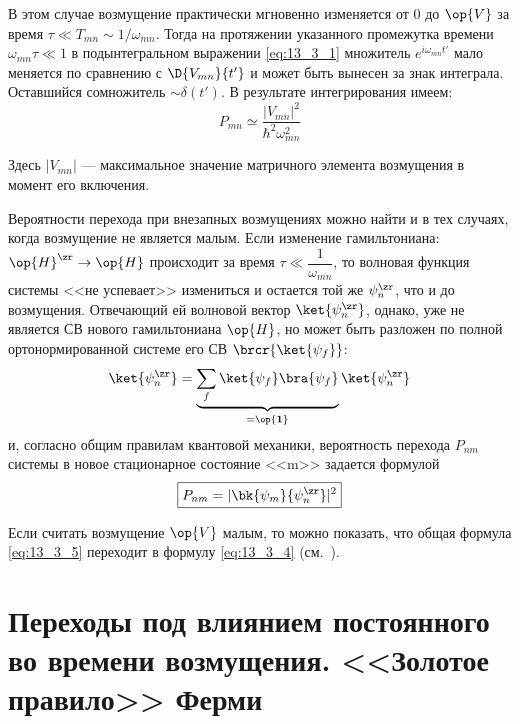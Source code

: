 В этом случае возмущение практически мгновенно изменяется от 0 до $\op{V}$ за время $\tau \ll T_{mn} \sim 1/\omega_{mn}$. Тогда на протяжении указанного промежутка времени $\omega_{mn} \tau \ll 1$ в подынтегральном выражении \eqref{eq:13_3_1} множитель $e^{i\omega_{mn} t'}$ мало меняется по сравнению с $\D{V_{mn}}{t'}$ и может быть вынесен за знак интеграла. Оставшийся сомножитель $\sim \delta(t')$. В результате интегрирования имеем:
\begin{equation}
\label{eq:13_3_4}
\boxed{P_{mn} \simeq \frac{|V_{mn}|^2}{\hbar^2 \omega_{mn}^2}}
\end{equation}

Здесь $|V_{mn}|$ --- максимальное значение матричного элемента возмущения в момент его включения.

Вероятности перехода при внезапных возмущениях можно найти и в тех случаях, когда возмущение не является малым. Если изменение гамильтониана: $\op{H}^\zr \to \op{H}$ происходит за время $\tau \ll \dfrac{1}{\omega_{mn}}$, то волновая функция системы <<не успевает>> измениться и остается той же $\psi_n^\zr$, что и до возмущения. Отвечающий ей волновой вектор $\ket{\psi_n^\zr}$, однако, уже не является СВ нового гамильтониана $\op{H}$, но может быть разложен по полной ортонормированной системе его СВ $\brcr{\ket{\psi_f}}$:
$$
\ket{\psi_n^\zr} = \underbrace{\sum_f \ket{\psi_f} \bra{\psi_f}}_{=\op{\mathbf{1}}}\ket{\psi_n^\zr}
$$
и, согласно общим правилам квантовой механики, вероятность перехода $P_{nm}$ системы в новое стационарное состояние <<m>> задается формулой
\begin{equation}
\label{eq:13_3_5}
\boxed{P_{nm} = |\bk{\psi_m}{\psi_n^\zr}|^2}
\end{equation}

Если считать возмущение $\op{V}$ малым, то можно показать, что общая формула \eqref{eq:13_3_5} переходит в формулу \eqref{eq:13_3_4} (см.~).

\section{Переходы под влиянием постоянного во времени возмущения. <<Золотое правило>> Ферми}

